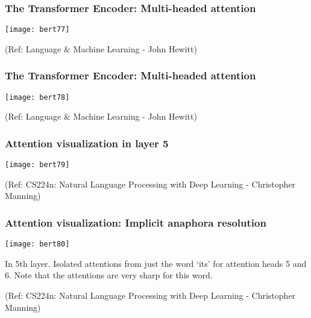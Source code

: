 \begin{frame}[fragile]\frametitle{The Transformer Encoder: Multi-headed attention}

			
			\begin{center}
			\texttt{[image: bert77]}
			\end{center}		
			
{\tiny (Ref: Language \& Machine Learning - John Hewitt)}

\end{frame}

\begin{frame}[fragile]\frametitle{The Transformer Encoder: Multi-headed attention}

			
			\begin{center}
			\texttt{[image: bert78]}
			\end{center}		
			
{\tiny (Ref: Language \& Machine Learning - John Hewitt)}

\end{frame}

\begin{frame}[fragile]\frametitle{Attention visualization in layer 5}

			
			\begin{center}
			\texttt{[image: bert79]}
			\end{center}		
			
			{\tiny (Ref: CS224n: Natural Language Processing with Deep Learning - Christopher Manning)}

\end{frame}

\begin{frame}[fragile]\frametitle{Attention visualization: Implicit anaphora resolution}

			
			\begin{center}
			\texttt{[image: bert80]}
			\end{center}		
			
			In 5th layer. Isolated attentions from just the word ‘its’ for attention heads 5 and 6.  Note that the attentions are very sharp for this word.

			
			{\tiny (Ref: CS224n: Natural Language Processing with Deep Learning - Christopher Manning)}

\end{frame}

